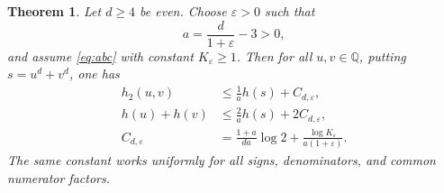 \documentclass[11pt,a4paper]{article}
\newtheorem{theorem}{Theorem}[section]
\newcommand{\Q}{\mathbb Q}
\begin{document}
\begin{theorem}\label{thm:even-power}
Let $d\ge4$ be even. Choose $\varepsilon>0$ such that
\[
       a=\frac{d}{1+\varepsilon}-3>0,
\]
and assume \eqref{eq:abc} with constant $K_\varepsilon\ge1$.
Then for all $u,v\in\Q$, putting $s=u^d+v^d$, one has
\begin{align}
 h_2(u,v)&\le\frac1a h(s)+C_{d,\varepsilon},\label{eq:pair}\\
 h(u)+h(v)&\le\frac2a h(s)+2C_{d,\varepsilon},\label{eq:sum}\\
 C_{d,\varepsilon}
 &=\frac{1+a}{da}\log2+
                    \frac{\log K_\varepsilon}{a(1+\varepsilon)}.
 \nonumber
\end{align}
The same constant works uniformly for all signs, denominators,
and common numerator factors.
\end{theorem}
\end{document}

